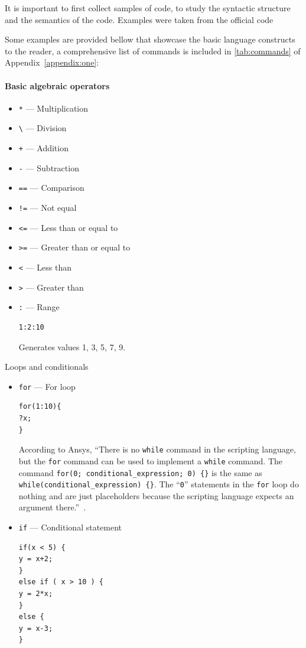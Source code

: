 It is important to first collect samples of code, to study the syntactic structure and the semantics of the code. Examples were taken from the official code 

Some examples are provided bellow that showcase the basic language constructs to the reader, a comprehensive list of commands is included in \cref{tab:commands} of Appendix~\ref{appendix:one}:

\paragraph*{Basic algebraic operators}
\begin{itemize}
\item \texttt{*} --- Multiplication
\item \texttt{\textbackslash} --- Division
\item \texttt{+} --- Addition
\item \texttt{-} --- Subtraction
\item \texttt{==} --- Comparison
\item \texttt{!=} --- Not equal
\item \texttt{<=} --- Less than or equal to
\item \texttt{>=} --- Greater than or equal to
\item \texttt{<} --- Less than
\item \texttt{>} --- Greater than
\item \texttt{:} --- Range
\begin{lstlisting}
1:2:10
\end{lstlisting}
Generates values 1, 3, 5, 7, 9.
\end{itemize}

Loops and conditionals
\begin{itemize}
\item \texttt{for} --- For loop
\begin{lstlisting}
for(1:10){ 
?x; 
} 
\end{lstlisting}

According to Ansys, ``There is no \texttt{while} command in the scripting language, but the \texttt{for} command can be used to implement a \texttt{while} command. The command \texttt{for(0; conditional\_expression; 0) \{\}} is the same as \texttt{while(conditional\_expression) \{\}}. The ``\texttt{0}'' statements in the \texttt{for} loop do nothing and are just placeholders because the scripting language expects an argument there.''~\cite{ansys_for_command}.

\item \texttt{if} --- Conditional statement
\begin{lstlisting}
if(x < 5) {
y = x+2;
} 
else if ( x > 10 ) {
y = 2*x;
} 
else {
y = x-3;
} 
\end{lstlisting}
\end{itemize}

